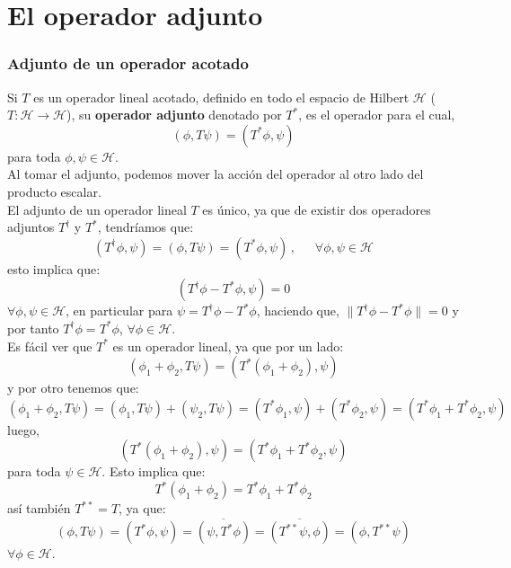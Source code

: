 \documentclass[12pt]{book}
\numberwithin{equation}{chapter}
\def\n{\noindent}
\def\ol{\overline}
\def\rar{\rightarrow}
\def\H{\mathcal{H}}
\begin{document}
\newpage

\section{El operador adjunto}

\subsubsection{Adjunto de un operador acotado}
Si $T$ es un operador lineal acotado, definido en todo el espacio de Hilbert $\H$ ($T: \H \rar \H$), su {\bf operador adjunto} denotado por $T^{*}$, es el operador para el cual,
\begin{equation}\label{adj-def}
( \phi , T \psi )= ( T^{*}\phi , \psi )
\end{equation}
para toda $ \phi , \psi \in \H $.\\

Al tomar el adjunto, podemos mover la acci\'on del operador al otro lado del producto escalar.\\
El adjunto de un operador lineal $T$ es \'unico, ya que de existir dos operadores adjuntos $T^{\dag}$ y $T^{*}$, tendr\'iamos que:
$$ (T^{\dag}\phi,\psi )=(\phi , T\psi)=(T^{*}\phi,\psi) \,,\,\,\,\,\,\,\,\,\, \forall \phi , \psi \in \H $$
esto implica que:
$$ (T^{\dag}\phi - T^{*} \phi ,\psi )=0 $$
$\forall \phi , \psi \in \H$, en particular para $\psi =T^{\dag}\phi - T^{*} \phi$, haciendo que, $\| T^{\dag}\phi - T^{*} \phi \|=0$ y por tanto $ T^{\dag}\phi = T^{*} \phi $, $\forall \phi \in \H$.\\

\n Es f\'acil ver que $T^{*}$ es un operador lineal, ya que por un lado:
$$ (\phi_{1}+\phi_{2} , T\psi) = (T^{*}(\phi_{1}+\phi_{2}),\psi) $$
y por otro tenemos que:
$$ (\phi_{1}+\phi_{2} , T\psi) = (\phi_{1},T\psi) + (\psi_{2},T\psi) = (T^{*}\phi_{1},\psi) + (T^{*}\phi_{2},\psi) = (T^{*}\phi_{1}+T^{*}\phi_{2},\psi) $$
luego,
$$(T^{*}(\phi_{1}+\phi_{2}),\psi) =(T^{*}\phi_{1}+T^{*}\phi_{2},\psi) $$
para toda $\psi \in \H$. Esto implica que:
\begin{equation}
T^{*}(\phi_{1}+\phi_{2}) = T^{*}\phi_{1}+T^{*}\phi_{2}
\end{equation}
as\'i tambi\'en $ T^{* *} =T $, ya que:
\begin{equation}
(\phi , T\psi )= ( T^{*}\phi , \psi )= \ol{ ( \psi , T^{*} \phi ) } = \ol{ ( T^{* *} \psi , \phi ) }= ( \phi , T^{* *} \psi )
\end{equation}
$\forall \phi \in \H$.\\
\end{document}
